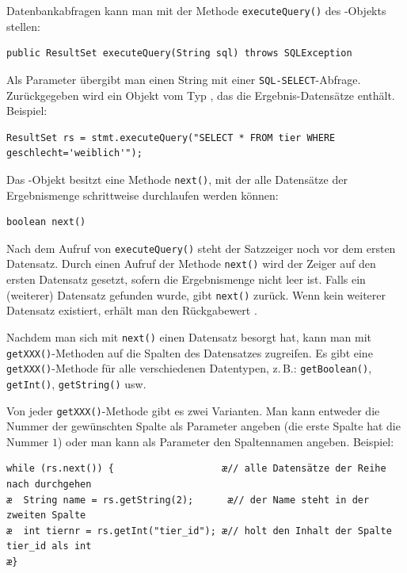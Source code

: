Datenbankabfragen kann man mit der Methode \lstinline|executeQuery()| des
-Objekts stellen:

\begin{lstlisting}
public ResultSet executeQuery(String sql) throws SQLException
\end{lstlisting}

Als Parameter übergibt man einen String mit einer \lstinline|SQL-SELECT|-Abfrage.
Zurückgegeben wird ein Objekt vom Typ , das die
Ergebnis-Datensätze enthält. Beispiel:

\begin{lstlisting}
ResultSet rs = stmt.executeQuery("SELECT * FROM tier WHERE geschlecht='weiblich'");
\end{lstlisting}

Das -Objekt besitzt eine Methode \lstinline|next()|, mit der
alle Datensätze der Ergebnismenge schrittweise durchlaufen werden können:

\begin{lstlisting}
boolean next()
\end{lstlisting}

Nach dem Aufruf von \lstinline|executeQuery()| steht der Satzzeiger noch vor dem
ersten Datensatz. Durch einen Aufruf der Methode \lstinline|next()| wird der
Zeiger auf den ersten Datensatz gesetzt, sofern die Ergebnismenge nicht leer
ist. Falls ein (weiterer) Datensatz gefunden wurde, gibt \lstinline|next()|
 zurück. Wenn kein weiterer Datensatz existiert, erhält man den
Rückgabewert .

Nachdem man sich mit \lstinline|next()| einen Datensatz besorgt hat, kann man
mit \lstinline|getXXX()|-Methoden auf die Spalten des Datensatzes zugreifen. Es
gibt eine \lstinline|getXXX()|-Methode für alle verschiedenen Datentypen, z.\,B.:
\lstinline|getBoolean()|, \lstinline|getInt()|, \lstinline|getString()| usw.

Von jeder \lstinline|getXXX()|-Methode gibt es zwei Varianten. Man kann entweder
die Nummer der gewünschten Spalte als Parameter angeben (die erste Spalte hat
die Nummer $1$) oder man kann als Parameter den Spaltennamen angeben. Beispiel:

\begin{lstlisting}
while (rs.next()) {                   æ// alle Datensätze der Reihe nach durchgehen 
æ  String name = rs.getString(2);      æ// der Name steht in der zweiten Spalte
æ  int tiernr = rs.getInt("tier_id"); æ// holt den Inhalt der Spalte tier_id als int 
æ}
\end{lstlisting}


